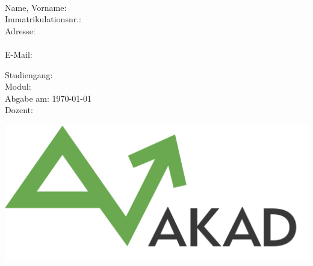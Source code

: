 \thispagestyle{empty}
{\centering
\vspace*{\fill}
\Huge{\textbf{\assi}}

\vspace{\baselineskip}

\Huge{\titel}
\vspace{\baselineskip} \\
\Large{\betreff}

\vspace{\baselineskip}

\begin{multicols}{2}
\raggedright
\setlength{\columnseprule}{1pt}
\begin{small}

Name, Vorname: \tabto{40mm} \name \\
Immatrikulationsnr.:  \tabto{40mm} \immanr \\
Adresse: \tabto{40mm} \strasse \\
\tabto{40mm} \plzort \\
E-Mail: \tabto{40mm} \email

\columnbreak

Studiengang:  \tabto{40mm} \stud \\
Modul:  \tabto{40mm} \modul \\
Abgabe am:  \tabto{40mm} \today \\
Dozent:  \tabto{40mm} \dozent

\end{small}
\end{multicols}{}

\vfill\vfill

\includegraphics[scale=0.35]{Bilder/akad_logo.png}\par}

